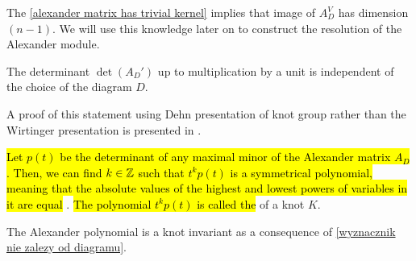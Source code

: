 The \cref{alexander matrix has trivial kernel} implies that image of $A_D^V$ has dimension $(n-1)$. We will use this knowledge later on to construct the resolution of the Alexander module.

\begin{theorem}\label{wyznacznik nie zalezy od diagramu}
  The determinant $\det(A_D')$ up to multiplication by a unit is independent of the choice of the diagram $D$.
\end{theorem}

A proof of this statement using Dehn presentation of knot group rather than the Wirtinger presentation is presented in \cite{alex-oryginal}.

\begin{definition}
  \hl{Let $p(t)$ be the determinant of any maximal minor of the Alexander matrix $A_D$. Then, we can find $k\in\operatorname{\mathbb{Z}}$ such that $t^kp(t)$ is a symmetrical polynomial, meaning that the absolute values of the highest and lowest powers of variables in it are equal} \cite{alex-oryginal}. \hl{The polynomial $t^kp(t)$ is called the } of a knot $K$.
\end{definition}

The Alexander polynomial is a knot invariant as a consequence of \cref{wyznacznik nie zalezy od diagramu}.

